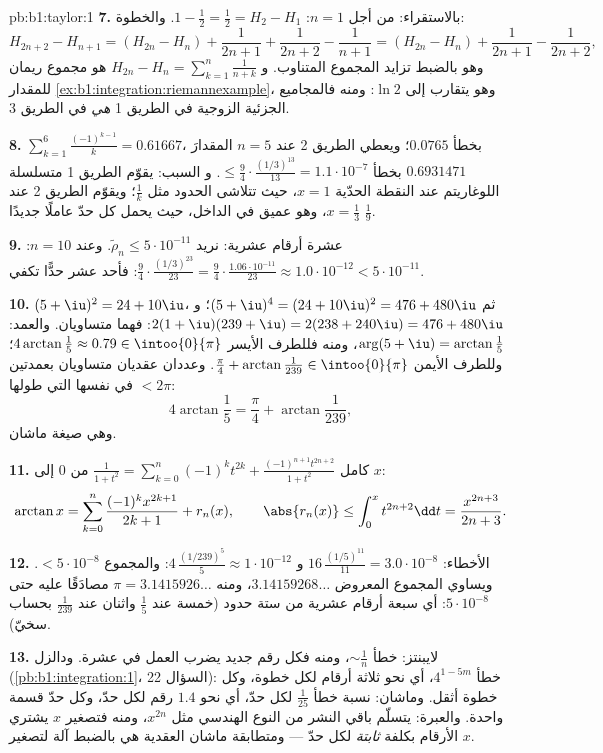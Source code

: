 \begin{solution}{pb:b1:taylor:1}
\textbf{7.} بالاستقراء: من أجل $n = 1$: $1 - \frac12 = \frac12 = H_2
- H_1$. والخطوة:
\[
H_{2n+2} - H_{n+1} = (H_{2n} - H_n) + \frac{1}{2n+1} +
\frac{1}{2n+2} - \frac{1}{n+1}
= (H_{2n} - H_n) + \frac{1}{2n+1} - \frac{1}{2n+2},
\]
وهو بالضبط تزايد المجموع المتناوب. و
$H_{2n} - H_n = \sum_{k=1}^{n}\frac{1}{n+k}$ هو مجموع ريمان
للمقدار \cref{ex:b1:integration:riemannexample}، وهو يتقارب إلى $\ln
2$: ومنه فالمجاميع الجزئية الزوجية في الطريق 1 \emph{هي} 
في الطريق 3.

\textbf{8.} $\sum_{k=1}^{6}\frac{(-1)^{k-1}}{k} = 0.61667$،
بخطأ $0.0765$؛ ويعطي الطريق 2 عند $n = 5$ المقدارَ $0.6931471$ بخطأ
$\leq \frac94\cdot\frac{(1/3)^{13}}{13} = 1.1\cdot10^{-7}$. و
السبب: يقوّم الطريق 1 متسلسلة اللوغاريتم عند النقطة الحدّية
$x = 1$، حيث تتلاشى الحدود مثل $\frac1k$؛ ويقوّم الطريق 2
عند $x = \frac13$، وهو عميق في الداخل، حيث يحمل كل حدّ
عاملًا جديدًا $\frac19$.

\textbf{9.} عشرة أرقام عشرية: نريد $\tilde\rho_n \leq
5\cdot10^{-11}$. وعند $n = 10$: $\frac94 \cdot
\frac{(1/3)^{23}}{23} = \frac94\cdot\frac{1.06\cdot10^{-11}}{23}
\approx 1.0\cdot10^{-12} < 5\cdot10^{-11}$: فأحد عشر حدًّا
تكفي.

\textbf{10.} $(5+\iu)^2 = 24 + 10\iu$، ثم $(5+\iu)^4 = (24 +
10\iu)^2 = 476 + 480\iu$؛ و $2(1+\iu)(239+\iu) = 2(238 +
240\iu) = 476 + 480\iu$: فهما متساويان. والعمد: $\arg(5 + \iu) =
\arctan\frac15$، ومنه فللطرف الأيسر 
$4\arctan\frac15 \approx 0.79 \in \intoo{0}{\pi}$؛ وللطرف
الأيمن  $\frac\pi4 + \arctan\frac{1}{239} \in
\intoo{0}{\pi}$. وعددان عقديان متساويان بعمدتين في
 نفسها التي طولها $< 2\pi$:
\[
4\arctan\frac15 = \frac\pi4 + \arctan\frac{1}{239} ,
\]
وهي صيغة ماشان.

\textbf{11.} كامل $\frac{1}{1+t^2} = \sum_{k=0}^n (-1)^k
t^{2k} + \frac{(-1)^{n+1}t^{2n+2}}{1+t^2}$ من $0$ إلى $x$:
\[
\arctan x = \sum_{k=0}^{n}\frac{(-1)^k x^{2k+1}}{2k+1} +
r_n(x),
\qquad
\abs{r_n(x)} \leq \int_0^x t^{2n+2}\dd t =
\frac{x^{2n+3}}{2n+3} .
\]

\textbf{12.} الأخطاء: $16\,\frac{(1/5)^{11}}{11} = 3.0\cdot
10^{-8}$ و $4\,\frac{(1/239)^5}{5} \approx 1\cdot10^{-12}$:
والمجموع $< 5\cdot10^{-8}$. ويساوي المجموع المعروض
$3.14159268\dots$، ومنه $\pi = 3.1415926\dots$ مصادَقًا عليه حتى
$5\cdot10^{-8}$: أي سبعة أرقام عشرية من ستة حدود (خمسة عند
$\frac15$ واثنان عند $\frac1{239}$ بحساب سخيّ).

\textbf{13.} لايبنتز: خطأ $\sim \frac1n$، ومنه فكل رقم جديد
يضرب العمل في عشرة. ودالزل
(\cref{pb:b1:integration:1}، السؤال 22): خطأ $4^{1-5m}$،
أي نحو ثلاثة أرقام لكل خطوة، وكل خطوة  أثقل.
وماشان: نسبة خطأ $\frac{1}{25}$ لكل حدّ، أي نحو $1.4$ رقم
لكل حدّ، وكل حدّ قسمة واحدة. والعبرة: يتسلّم باقي
النشر من النوع الهندسي مثل $x^{2n}$، ومنه فتصغير $x$
يشتري الأرقام بكلفة \emph{ثابتة} لكل حدّ --- ومتطابقة
ماشان العقدية هي بالضبط آلة لتصغير $x$.


\end{solution}
